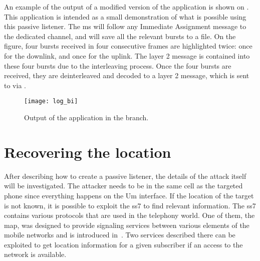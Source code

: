     An example of the output of a modified version of the
     application is shown on . This
    application is intended as a small demonstration of what is possible
    using this passive listener. The \gls{ms} will follow any Immediate
    Assignment message to the dedicated channel, and will save all the
    relevant bursts to a file. On the figure, four bursts received in
    four consecutive frames are highlighted twice: once for the
    downlink, and once for the uplink. The layer 2 message is contained
    into these four bursts due to the interleaving process. Once the
    four bursts are received, they are deinterleaved and decoded to a
    layer 2 message, which is sent to  via
    .

    \begin{figure}[h]
      \centering
      \texttt{[image: log\_bi]}
      \caption{Output of the  application in the
         branch.}
      \label{fig:log_bi}
    \end{figure}

    \iffalse On Mon, Aug 29, 2011 at 01:55:59AM +0200, Lukas Kuzmiak
    wrote: > If I'm not mistaken pl2303 based cables have/had problems
    handling baudrates > above 115200, there was a recent update into
    the kernel tree, but I've never > tested it.

the problem is not "[standard] baud rates above 115200" but it is
"non-standard baud-rates at all".  Normal USARTs have baud-rate
generators that can only generate baud-rates "input_clock / divider"
where divider is either an integer, or even more: limited to a power of
2

The calypso cannot do any standard baud-rates above 115200.  That's why
you need a USART with more flexible baud rate generator.  The most
commonly known one to do this is the FTDI series of USB-serial
converters. 
    \fi

  \section{Recovering the location}

    After describing how to create a passive listener, the details of
    the attack itself will be investigated. The attacker needs to be in
    the same cell as the targeted phone since everything happens on the
    Um interface. If the location of the target is not known, it is
    possible to exploit the \gls{ss7} to find relevant information. The
    \gls{ss7} contains various protocols that are used in the telephony
    world. One of them, the \gls{map}, was designed to provide signaling
    services between various elements of the mobile networks and is
    introduced in~. Two services described there can be
    exploited to get location information for a given subscriber if an
    access to the network is available.

